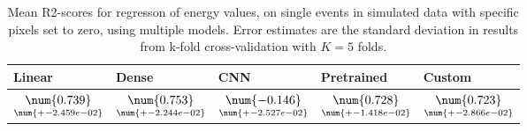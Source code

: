 \begin{table}
\centering
\caption{
Mean R2-scores for regresson of energy values, on single events in simulated data with specific pixels
set to zero, using multiple models. 
Error estimates are the standard deviation in results from k-fold cross-validation 
with $K=5$ folds.
}
\label{tab:regression-simulated-single-energy-pixelmod-r2}
\begin{tabular}{lllll}
\toprule
                                             Linear &                                               Dense &                                                  CNN &                                          Pretrained &                                              Custom \\
\midrule
 $\underset{\num{+- 2.459e-02 }  }{\num{ 0.739 } }$ &  $\underset{\num{+- 2.244e-02 }  }{\num{ 0.753 } }$ &  $\underset{\num{+- 2.527e-02 }  }{\num{ -0.146 } }$ &  $\underset{\num{+- 1.418e-02 }  }{\num{ 0.728 } }$ &  $\underset{\num{+- 2.866e-02 }  }{\num{ 0.723 } }$ \\
\bottomrule
\end{tabular}
\end{table}
